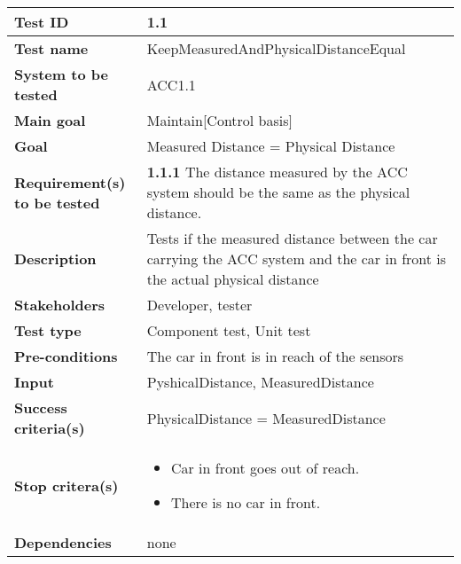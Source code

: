 \begin{table}[H]
		\begin{tabular}{| p{4cm} | p{10cm} |}
		\hline
		\rowcolor{gray}
			{\bf Test ID} & 1.1 \\ \hline
			{\bf Test name} & KeepMeasuredAndPhysicalDistanceEqual\\ \hline
			{\bf System to be tested} & ACC1.1\\ \hline
			{\bf Main goal} & Maintain[Control basis]\\ \hline
			{\bf Goal} & Measured Distance = Physical Distance\\ \hline
			{\bf Requirement(s) to be tested} & {\bf 1.1.1} The distance measured by the 
			ACC system should be the same as the physical distance.\\ \hline
			{\bf Description} & Tests if the measured distance between the car carrying 
			the ACC system and the car in front is the actual physical distance\\ \hline
			{\bf Stakeholders} & Developer, tester\\ \hline
			{\bf Test type} &  Component test, Unit test \\ \hline
			{\bf Pre-conditions} & The car in front is in reach of the sensors \\ \hline
			{\bf Input} & PyshicalDistance, MeasuredDistance \\ \hline
			{\bf Success criteria(s)} & PhysicalDistance = MeasuredDistance \\ \hline
			{\bf Stop critera(s)} &  
				\begin{itemize}
					\item Car in front goes out of reach. 
					\item There is no car in front.
				\end{itemize} \\ \hline
			{\bf Dependencies} & none \\ \hline
		\end{tabular}
	\end{table}

